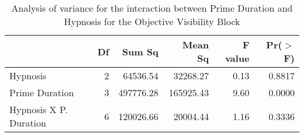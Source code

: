 \documentclass{article}
\begin{document}
\begin{table}
\caption{Analysis of variance for the interaction between Prime Duration and Hypnosis for the Objective Visibility Block}

\begin{tabular}{lrrrrr}
  \hline
 & Df & Sum Sq & Mean Sq & F value & Pr($>$F) \\ 
  \hline
Hypnosis       & 2 & 64536.54 & 32268.27 & 0.13 & 0.8817 \\ 
  Prime Duration        & 3 & 497776.28 & 165925.43 & 9.60 & 0.0000 \\ 
  Hypnosis X P. Duration   & 6 & 120026.66 & 20004.44 & 1.16 & 0.3336 \\ 
   \hline
\end{tabular}
\end{table}
\end{document}
